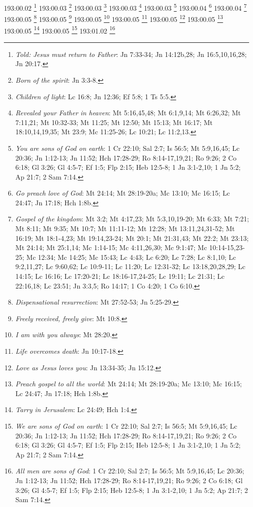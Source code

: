 193:00.02 \footnote{\textit{Told: Jesus must return to Father}: Jn 7:33-34; Jn 14:12b,28; Jn 16:5,10,16,28; Jn 20:17.}
193:00.03 \footnote{\textit{Born of the spirit}: Jn 3:3-8.}
193:00.03 \footnote{\textit{Children of light}: Lc 16:8; Jn 12:36; Ef 5:8; 1 Ts 5:5.}
193:00.03 \footnote{\textit{Revealed your Father in heaven}: Mt 5:16,45,48; Mt 6:1,9,14; Mt 6:26,32; Mt 7:11,21; Mt 10:32-33; Mt 11:25; Mt 12:50; Mt 15:13; Mt 16:17; Mt 18:10,14,19,35; Mt 23:9; Mc 11:25-26; Lc 10:21; Lc 11:2,13.}
193:00.03 \footnote{\textit{You are sons of God on earth}: 1 Cr 22:10; Sal 2:7; Is 56:5; Mt 5:9,16,45; Lc 20:36; Jn 1:12-13; Jn 11:52; Hch 17:28-29; Ro 8:14-17,19,21; Ro 9:26; 2 Co 6:18; Gl 3:26; Gl 4:5-7; Ef 1:5; Flp 2:15; Heb 12:5-8; 1 Jn 3:1-2,10; 1 Jn 5:2; Ap 21:7; 2 Sam 7:14.}
193:00.04 \footnote{\textit{Go preach love of God}: Mt 24:14; Mt 28:19-20a; Mc 13:10; Mc 16:15; Lc 24:47; Jn 17:18; Hch 1:8b.}
193:00.04 \footnote{\textit{Gospel of the kingdom}: Mt 3:2; Mt 4:17,23; Mt 5:3,10,19-20; Mt 6:33; Mt 7:21; Mt 8:11; Mt 9:35; Mt 10:7; Mt 11:11-12; Mt 12:28; Mt 13:11,24,31-52; Mt 16:19; Mt 18:1-4,23; Mt 19:14,23-24; Mt 20:1; Mt 21:31,43; Mt 22:2; Mt 23:13; Mt 24:14; Mt 25:1,14; Mc 1:14-15; Mc 4:11,26,30; Mc 9:1:47; Mc 10:14-15,23-25; Mc 12:34; Mc 14:25; Mc 15:43; Lc 4:43; Lc 6:20; Lc 7:28; Lc 8:1,10; Lc 9:2,11,27; Lc 9:60,62; Lc 10:9-11; Lc 11:20; Lc 12:31-32; Lc 13:18,20,28,29; Lc 14:15; Lc 16:16; Lc 17:20-21; Lc 18:16-17,24-25; Lc 19:11; Lc 21:31; Lc 22:16,18; Lc 23:51; Jn 3:3,5; Ro 14:17; 1 Co 4:20; 1 Co 6:10.}
193:00.05 \footnote{\textit{Dispensational resurrection}: Mt 27:52-53; Jn 5:25-29.}
193:00.05 \footnote{\textit{Freely received, freely give}: Mt 10:8.}
193:00.05 \footnote{\textit{I am with you always}: Mt 28:20.}
193:00.05 \footnote{\textit{Life overcomes death}: Jn 10:17-18.}
193:00.05 \footnote{\textit{Love as Jesus loves you}: Jn 13:34-35; Jn 15:12.}
193:00.05 \footnote{\textit{Preach gospel to all the world}: Mt 24:14; Mt 28:19-20a; Mc 13:10; Mc 16:15; Lc 24:47; Jn 17:18; Hch 1:8b.}
193:00.05 \footnote{\textit{Tarry in Jerusalem}: Lc 24:49; Hch 1:4.}
193:00.05 \footnote{\textit{We are sons of God on earth}: 1 Cr 22:10; Sal 2:7; Is 56:5; Mt 5:9,16,45; Lc 20:36; Jn 1:12-13; Jn 11:52; Hch 17:28-29; Ro 8:14-17,19,21; Ro 9:26; 2 Co 6:18; Gl 3:26; Gl 4:5-7; Ef 1:5; Flp 2:15; Heb 12:5-8; 1 Jn 3:1-2,10; 1 Jn 5:2; Ap 21:7; 2 Sam 7:14.}
193:01.02 \footnote{\textit{All men are sons of God}: 1 Cr 22:10; Sal 2:7; Is 56:5; Mt 5:9,16,45; Lc 20:36; Jn 1:12-13; Jn 11:52; Hch 17:28-29; Ro 8:14-17,19,21; Ro 9:26; 2 Co 6:18; Gl 3:26; Gl 4:5-7; Ef 1:5; Flp 2:15; Heb 12:5-8; 1 Jn 3:1-2,10; 1 Jn 5:2; Ap 21:7; 2 Sam 7:14.}
